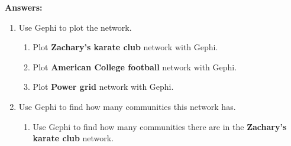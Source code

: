\documentclass{amsart}
\theoremstyle{definition}
\theoremstyle{remark}
\numberwithin{equation}{section}
\begin{document}
\vspace{0.5 cm}


\textbf{Answers:}

\vspace{0.5 cm}

\begin{enumerate}
    \item Use Gephi to plot the network. \vspace{0.5 cm}
    \begin{enumerate}
        \item Plot \textbf{Zachary's karate club} network with Gephi. \vspace{0.5 cm}



        \item Plot \textbf{American College football} network with Gephi. \vspace{0.5 cm}


        \item Plot \textbf{Power grid} network with Gephi. \vspace{0.5 cm}



    \end{enumerate}
    \item Use Gephi to find how many communities this network has. \vspace{0.5 cm}
    \begin{enumerate}
        \item Use Gephi to find how many communities there are in the \textbf{Zachary's karate club} network. \vspace{0.5 cm} 




\end{enumerate}
\end{enumerate}
\end{document}
